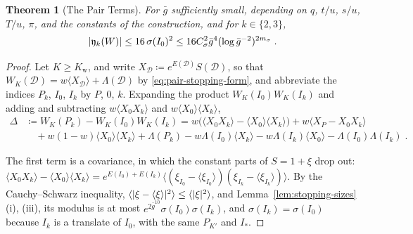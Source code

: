 \documentclass[11pt]{preprint}
\DeclarePairedDelimiter{\abs}{\lvert}{\rvert}
\numberwithin{equation}{section}
\newtheorem{theorem}{Theorem}[section]
\theoremstyle{definition}
\theoremstyle{remark}
\theoremstyle{plain}
\begin{document}
\begin{theorem}[The Pair Terms]\label{thm:pair-terms}
For $\bar g$ sufficiently small, depending on $q$, $t/u$, $s/u$, $T/u$, $\pi$, and the constants of the construction, and for $k \in \{ 2, 3 \}$,
\begin{equation}\label{eq:pair-terms}
    \abs{\mathfrak y_k(W)} \leq 16\,\sigma(I_0)^2 \leq 16C_\sigma^2\bar g^4(\log\bar g^{-2})^{2m_\sigma}\;.
\end{equation}
\end{theorem}

\begin{proof}
Let $K \geq K_{\mathrm w}$, and write $X_{\mathcal D} \coloneqq e^{E(\mathcal D)}S(\mathcal D)$, so that $W_K(\mathcal D) = w\langle X_{\mathcal D}\rangle + \Lambda(\mathcal D)$ by \eqref{eq:pair-stopping-form}, and abbreviate the indices $P_k$, $I_0$, $I_k$ by $P$, $0$, $k$. Expanding the product $W_K(I_0)W_K(I_k)$ and adding and subtracting $w\langle X_0X_k\rangle$ and $w\langle X_0\rangle\langle X_k\rangle$,
\begin{equation}\label{eq:pair-decomposition}
\begin{split}
    \Delta &\coloneqq W_K(P_k) - W_K(I_0)W_K(I_k) = w\bigl(\langle X_0X_k\rangle - \langle X_0\rangle\langle X_k\rangle\bigr) + w\bigl\langle X_P - X_0X_k\bigr\rangle\\
    &\quad + w(1 - w)\langle X_0\rangle\langle X_k\rangle + \Lambda(P_k) - w\Lambda(I_0)\langle X_k\rangle - w\Lambda(I_k)\langle X_0\rangle - \Lambda(I_0)\Lambda(I_k)\;.
\end{split}
\end{equation}

The first term is a covariance, in which the constant parts of $S = 1 + \xi$ drop out: $\langle X_0X_k\rangle - \langle X_0\rangle\langle X_k\rangle = e^{E(I_0) + E(I_k)}\langle(\xi_{I_0} - \langle\xi_{I_0}\rangle)(\xi_{I_k} - \langle\xi_{I_k}\rangle)\rangle$. By the Cauchy--Schwarz inequality, $\langle\abs{\xi - \langle\xi\rangle}^2\rangle \leq \langle\abs{\xi}^2\rangle$, and Lemma~\ref{lem:stopping-sizes}(i), (iii), its modulus is at most $e^{2\bar g^{10}}\sigma(I_0)\sigma(I_k)$, and $\sigma(I_k) = \sigma(I_0)$ because $I_k$ is a translate of $I_0$, with the same $P_{K'}$ and $I_*$.


\end{proof}
\end{document}
